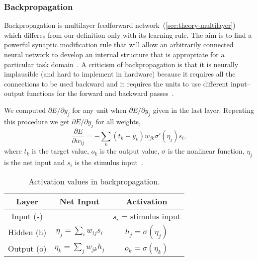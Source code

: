 \subsubsection{Backpropagation}
\label{sec:models-bp} 

Backpropagation is multilayer feedforward network~(\ref{sec:theory-multilayer}) which differes from our definition only with its learning rule. The aim is to find a powerful synaptic modification rule that will allow an arbitrarily connected neural network to develop an internal structure that is appropriate for a particular task domain~\citep{rumelhart1986learning}. A criticism of backpropagation is that it is neurally implausible (and hard to implement in hardware) because it requires all the connections to be used backward and it requires the units to use different input--output functions for the forward and backward passes~\citep{hinton1988learning}.

We computed $\partial E / \partial y_j$ for any unit when $\partial E / \partial y_j$ given in the last layer. Repeating this procedure we get $\partial E / \partial y_j$ for all weights, 
\begin{equation} 
\frac{\partial E}{\partial w_{ij}} = -\sum_k(t_k-y_k)w_{jk}\sigma'(\eta_j)s_i,
\end{equation}
where $t_k$ is the target value, $o_k$ is the output value, $\sigma$ is the nonlinear function, $\eta_j$ is the net input and $s_i$ is the stimulus input~\citep{o1996bio}.

\begin{table}[H] 
  \centering
  \begin{tabular}{|ccc|}
    \hline
    Layer & Net Input & Activation\\
    \hline
    Input (s)  & -- & $s_i$ = stimulus input\\
    \hline
    Hidden (h) & \hspace{0.3cm} $\eta_j = \sum_i w_{ij}s_i$ \hspace{0.3cm} &
    $h_j = \sigma(\eta_j)$\hspace{0.3cm}\\
    \hline
    Output (o) & \hspace{0.3cm} $\eta_k = \sum_j w_{jk}h_j$ \hspace{0.3cm} & 
    $o_k = \sigma(\eta_k)$\hspace{0.3cm}\\
    \hline
  \end{tabular}
  \caption{Activation values in backpropagation.}
  \label{tab:models-bp}
\end{table}
